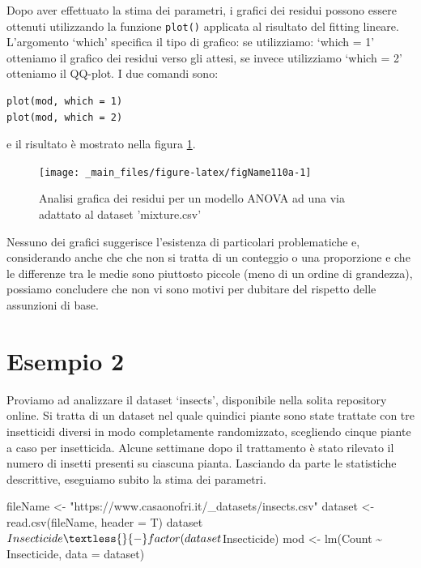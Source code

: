 \documentclass[a4paper,12pt,oneside]{book}
\newenvironment{Shaded}{\begin{snugshade}}{\end{snugshade}}
\newcommand{\SpecialCharTok}[1]{#1}
\newcommand{\StringTok}[1]{#1}
\newcommand{\OtherTok}[1]{#1}
\newcommand{\FunctionTok}[1]{#1}
\newcommand{\AttributeTok}[1]{#1}
\newcommand{\NormalTok}[1]{#1}
\begin{document}
Dopo aver effettuato la stima dei parametri, i grafici dei residui possono essere ottenuti utilizzando la funzione \texttt{plot()} applicata al risultato del fitting lineare. L'argomento `which' specifica il tipo di grafico: se utilizziamo: `which = 1' otteniamo il grafico dei residui verso gli attesi, se invece utilizziamo `which = 2' otteniamo il QQ-plot. I due comandi sono:

\begin{verbatim}
plot(mod, which = 1)
plot(mod, which = 2)
\end{verbatim}

e il risultato è mostrato nella figura \ref{fig:figName110a}.

\begin{figure}

{\centering \texttt{[image: \_main\_files/figure-latex/figName110a-1]} 

}

\caption{Analisi grafica dei residui per un modello ANOVA ad una via adattato al dataset 'mixture.csv'}\label{fig:figName110a}
\end{figure}

Nessuno dei grafici suggerisce l'esistenza di particolari problematiche e, considerando anche che che non si tratta di un conteggio o una proporzione e che le differenze tra le medie sono piuttosto piccole (meno di un ordine di grandezza), possiamo concludere che non vi sono motivi per dubitare del rispetto delle assunzioni di base.

\hypertarget{esempio-2}{%
\section{Esempio 2}\label{esempio-2}}

Proviamo ad analizzare il dataset `insects', disponibile nella solita repository online. Si tratta di un dataset nel quale quindici piante sono state trattate con tre insetticidi diversi in modo completamente randomizzato, scegliendo cinque piante a caso per insetticida. Alcune settimane dopo il trattamento è stato rilevato il numero di insetti presenti su ciascuna pianta. Lasciando da parte le statistiche descrittive, eseguiamo subito la stima dei parametri.

\begin{Shaded}
\begin{Highlighting}[]
\NormalTok{fileName }\OtherTok{\textless{}{-}} \StringTok{"https://www.casaonofri.it/\_datasets/insects.csv"}
\NormalTok{dataset }\OtherTok{\textless{}{-}} \FunctionTok{read.csv}\NormalTok{(fileName, }\AttributeTok{header =}\NormalTok{ T)}
\NormalTok{dataset}\SpecialCharTok{$}\NormalTok{Insecticide }\OtherTok{\textless{}{-}} \FunctionTok{factor}\NormalTok{(dataset}\SpecialCharTok{$}\NormalTok{Insecticide)}
\NormalTok{mod }\OtherTok{\textless{}{-}} \FunctionTok{lm}\NormalTok{(Count }\SpecialCharTok{\textasciitilde{}}\NormalTok{ Insecticide, }\AttributeTok{data =}\NormalTok{ dataset)}
\end{Highlighting}
\end{Shaded}
\end{document}
